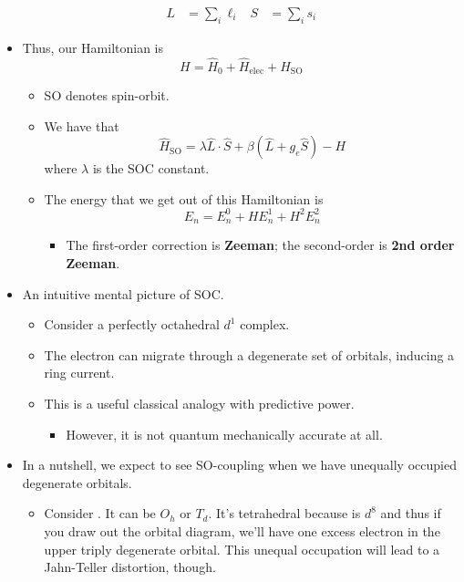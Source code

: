 \documentclass[../notes.tex]{subfiles}
\begin{document}
\begin{itemize}
    \begin{align*}
        L &= \sum_i\ell_i&
        S &= \sum_is_i
    \end{align*}
    \item Thus, our Hamiltonian is
    \begin{equation*}
        H = \hat{H}_0+\hat{H}_\text{elec}+\hat{H}_\text{SO}
    \end{equation*}
    \begin{itemize}
        \item SO denotes spin-orbit.
        \item We have that
        \begin{equation*}
            \hat{H}_\text{SO} = \lambda\hat{L}\cdot\hat{S}+\beta(\hat{L}+g_e\hat{S})-H
        \end{equation*}
        where $\lambda$ is the SOC constant.
        \item The energy that we get out of this Hamiltonian is
        \begin{equation*}
            E_n = E_n^0+HE_n^1+H^2E_n^2
        \end{equation*}
        \begin{itemize}
            \item The first-order correction is \textbf{Zeeman}; the second-order is \textbf{2nd order Zeeman}.
        \end{itemize}
    \end{itemize}
    \item An intuitive mental picture of SOC.
    \begin{itemize}
        \item Consider a perfectly octahedral $d^1$ complex.
        \item The electron can migrate through a degenerate set of orbitals, inducing a ring current.
        \item This is a useful classical analogy with predictive power.
        \begin{itemize}
            \item However, it is not quantum mechanically accurate at all.
        \end{itemize}
    \end{itemize}
    \item In a nutshell, we expect to see SO-coupling when we have unequally occupied degenerate orbitals.
    \begin{itemize}
        \item Consider . It can be $O_h$ or $T_d$. It's tetrahedral because  is $d^8$ and thus if you draw out the orbital diagram, we'll have one excess electron in the upper triply degenerate orbital. This unequal occupation will lead to a Jahn-Teller distortion, though.

\end{itemize}
\end{itemize}
\end{document}
